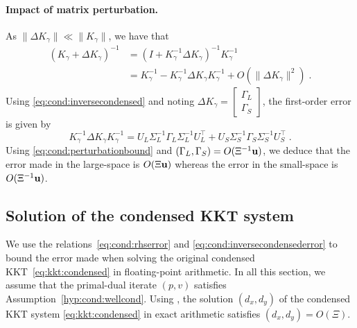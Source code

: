 \paragraph{Impact of matrix perturbation.}
As $\|\Delta K_\gamma\| \ll \|K_\gamma\|$, we have that
\begin{equation}
  \label{eq:cond:invperturbed}
  \begin{aligned}
    (K_\gamma + \Delta K_\gamma)^{-1} &= (I + K_\gamma^{-1} \Delta K_\gamma)^{-1} K_\gamma^{-1} \\
                                      &= K_\gamma^{-1} - K_\gamma^{-1}\Delta K_\gamma K_\gamma^{-1} + O(\|\Delta K_\gamma\|^2) \; .
  \end{aligned}
\end{equation}
Using \eqref{eq:cond:inversecondensed} and noting $\Delta K_\gamma = \begin{bmatrix}
  \Gamma_L \\ \Gamma _S
\end{bmatrix}$, the first-order error is given by
\begin{equation}
  \label{eq:cond:inversecondensederror}
  K_\gamma^{-1}\Delta K_\gamma K_\gamma^{-1}  =
U_L \Sigma_L^{-1} \Gamma_L \Sigma_L^{-1}U_L^\top  +
  U_S \Sigma_S^{-1} \Gamma_S \Sigma_S^{-1}U_S^\top  \;.
\end{equation}
Using \eqref{eq:cond:perturbationbound} and $(\Gamma_L, \Gamma_S)= O( \Xi^{-1}\mathbf{u})$,
we deduce that the error made in the large-space is $O(\Xi\mathbf{u})$ whereas
the error in the small-space is $O(\Xi^{-1}\mathbf{u} )$.

\subsection{Solution of the condensed KKT system}
We use the relations~\eqref{eq:cond:rhserror} and \eqref{eq:cond:inversecondensederror}
to bound the error made when solving the original condensed KKT~\eqref{eq:kkt:condensed}
in floating-point arithmetic.
In all this section, we assume that
the primal-dual iterate $(p,v)$ satisfies Assumption~\ref{hyp:cond:wellcond}.
Using \cite[Corollary 3.3]{wright2001effects}, the solution $(d_x, d_y)$ of the
condensed KKT system \eqref{eq:kkt:condensed} in exact arithmetic satisfies
$(d_x, d_y) = O(\Xi)$.

